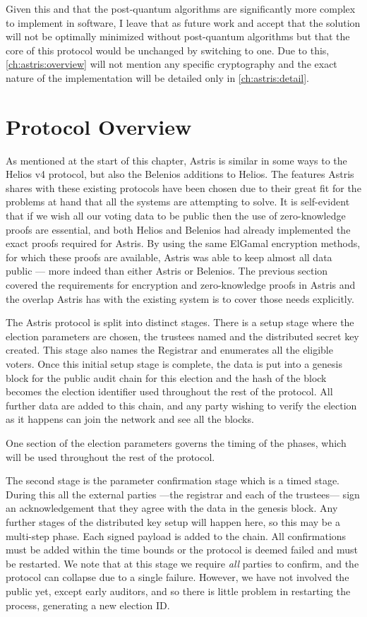 Given this and that the post-quantum algorithms are significantly more complex to implement in software, I leave that as future work and accept that the solution will not be optimally minimized without post-quantum algorithms but that the core of this protocol would be unchanged by switching to one. Due to this, \autoref{ch:astris:overview} will not mention any specific cryptography and the exact nature of the implementation will be detailed only in \autoref{ch:astris:detail}.

\section{Protocol Overview}
\label{ch:astris:overview}

As mentioned at the start of this chapter, Astris is similar in some ways to the Helios v4 protocol, but also the Belenios additions to Helios. The features Astris shares with these existing protocols have been chosen due to their great fit for the problems at hand that all the systems are attempting to solve. It is self-evident that if we wish all our voting data to be public then the use of zero-knowledge proofs are essential, and both Helios and Belenios had already implemented the exact proofs required for Astris. By using the same ElGamal encryption methods, for which these proofs are available, Astris was able to keep almost all data public --- more indeed than either Astris or Belenios. The previous section covered the requirements for encryption and zero-knowledge proofs in Astris and the overlap Astris has with the existing system is to cover those needs explicitly.

The Astris protocol is split into distinct stages. There is a setup stage where the election parameters are chosen, the trustees named and the distributed secret key created. This stage also names the Registrar and enumerates all the eligible voters. Once this initial setup stage is complete, the data is put into a genesis block for the public audit chain for this election and the hash of the block becomes the election identifier used throughout the rest of the protocol. All further data are added to this chain, and any party wishing to verify the election as it happens can join the network and see all the blocks.

One section of the election parameters governs the timing of the phases, which will be used throughout the rest of the protocol.

The second stage is the parameter confirmation stage which is a timed stage. During this all the external parties ---the registrar and each of the trustees--- sign an acknowledgement that they agree with the data in the genesis block. Any further stages of the distributed key setup will happen here, so this may be a multi-step phase. Each signed payload is added to the chain. All confirmations must be added within the time bounds or the protocol is deemed failed and must be restarted. We note that at this stage we require \emph{all} parties to confirm, and the protocol can collapse due to a single failure. However, we have not involved the public yet, except early auditors, and so there is little problem in restarting the process, generating a new election ID.

